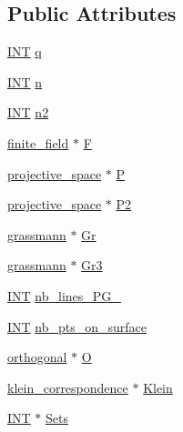 \subsection*{Public Attributes}
\begin{DoxyCompactItemize}
\item 
\mbox{\hyperlink{galois_8h_a09fddde158a3a20bd2dcadb609de11dc}{I\+NT}} \mbox{\hyperlink{classsurface_ad17ba400ff738e8f88938723bc09eba0}{q}}
\item 
\mbox{\hyperlink{galois_8h_a09fddde158a3a20bd2dcadb609de11dc}{I\+NT}} \mbox{\hyperlink{classsurface_ae1914ab225ba1a719395e88f67dd0d8c}{n}}
\item 
\mbox{\hyperlink{galois_8h_a09fddde158a3a20bd2dcadb609de11dc}{I\+NT}} \mbox{\hyperlink{classsurface_a2738edc2db856f38fbd86c7f97ea3cdf}{n2}}
\item 
\mbox{\hyperlink{classfinite__field}{finite\+\_\+field}} $\ast$ \mbox{\hyperlink{classsurface_a8ed6552162af114042077e109abf87f0}{F}}
\item 
\mbox{\hyperlink{classprojective__space}{projective\+\_\+space}} $\ast$ \mbox{\hyperlink{classsurface_a90a72158e9c87d4700c84815916a3f1e}{P}}
\item 
\mbox{\hyperlink{classprojective__space}{projective\+\_\+space}} $\ast$ \mbox{\hyperlink{classsurface_a369a004b26d006408ca0878b1e9b5c59}{P2}}
\item 
\mbox{\hyperlink{classgrassmann}{grassmann}} $\ast$ \mbox{\hyperlink{classsurface_a0bdb5c013ada07156132dabaf8644d7c}{Gr}}
\item 
\mbox{\hyperlink{classgrassmann}{grassmann}} $\ast$ \mbox{\hyperlink{classsurface_a9f6c0b80ab817e9869b8f64217a84121}{Gr3}}
\item 
\mbox{\hyperlink{galois_8h_a09fddde158a3a20bd2dcadb609de11dc}{I\+NT}} \mbox{\hyperlink{classsurface_ae95c0421237e1572cd1b530649d3e734}{nb\+\_\+lines\+\_\+\+P\+G\+\_}}
\item 
\mbox{\hyperlink{galois_8h_a09fddde158a3a20bd2dcadb609de11dc}{I\+NT}} \mbox{\hyperlink{classsurface_a0c74da9898d840b369433de6c4f85a06}{nb\+\_\+pts\+\_\+on\+\_\+surface}}
\item 
\mbox{\hyperlink{classorthogonal}{orthogonal}} $\ast$ \mbox{\hyperlink{classsurface_a4c9aaa2df55dd1787b29419f8e2bc7d9}{O}}
\item 
\mbox{\hyperlink{classklein__correspondence}{klein\+\_\+correspondence}} $\ast$ \mbox{\hyperlink{classsurface_acb954b01adc100059e007854d231a0e7}{Klein}}
\item 
\mbox{\hyperlink{galois_8h_a09fddde158a3a20bd2dcadb609de11dc}{I\+NT}} $\ast$ \mbox{\hyperlink{classsurface_a7a687dc42d8401ba0cc564894b420215}{Sets}}

\end{DoxyCompactItemize}

